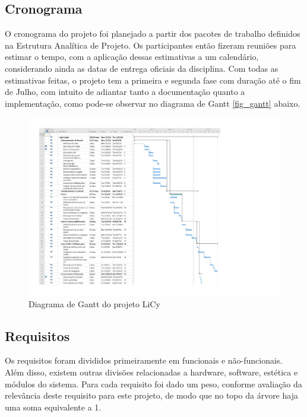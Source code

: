 	\subsection{Cronograma}\label{subsec-cronograma}
	
	O cronograma do projeto foi planejado a partir dos pacotes de trabalho definidos na Estrutura Analítica de Projeto. Os participantes então fizeram reuniões para estimar o tempo, com a aplicação dessas estimativas a um calendário, considerando ainda as datas de entrega oficiais da disciplina. Com todas as estimativas feitas, o projeto tem a primeira e segunda fase com duração até o fim de Julho, com intuito de adiantar tanto a documentação quanto a implementação, como pode-se observar no diagrama de Gantt  \autoref{fig_gantt} abaixo.
	
	\begin{figure}[h!]
		\caption{\label{fig_gantt} Diagrama de Gantt do projeto LiCy}
		\centering
		\includegraphics[width=1.0\textwidth, trim={1cm 1cm 7cm 1cm}, clip]{gantt.pdf}
	\end{figure}
	
	\subsection{Requisitos}\label{subsec-requisitos}
	
	Os requisitos foram divididos primeiramente em funcionais e não-funcionais. Além disso, existem outras divisões relacionadas a hardware, software, estética e módulos do sistema. Para cada requisito foi dado um peso, conforme avaliação da relevância deste requisito para este projeto, de modo que no topo da árvore haja uma soma equivalente a 1.
	
